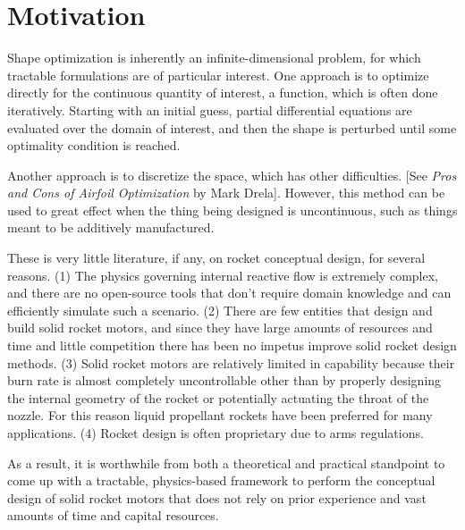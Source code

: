 \section{Motivation}
\label{sec:motivation}
	
Shape optimization is inherently an infinite-dimensional problem,
for which tractable formulations are of particular interest.
One approach is to optimize directly for the continuous quantity of interest, a function, which is often done iteratively.
Starting with an initial guess, partial differential equations are evaluated over the domain of interest,
and then the shape is perturbed until some optimality condition is reached.

Another approach is to discretize the space, which has other difficulties.
[See \textit{Pros and Cons of Airfoil Optimization} by Mark Drela].
However, this method can be used to great effect when the thing being designed is
uncontinuous, such as things meant to be additively manufactured.

These is very little literature, if any, on rocket conceptual design,
for several reasons. (1) The physics governing internal reactive flow is extremely complex,
and there are no open-source tools that don't require domain knowledge and
can efficiently simulate such a scenario.
(2) There are few entities that design and build solid rocket motors, and since they have
large amounts of resources and time and little competition there has been no impetus
improve solid rocket design methods. (3) Solid rocket motors are relatively limited
in capability because their burn rate is almost completely uncontrollable other
than by properly designing the internal geometry of the rocket or potentially actuating the
throat of the nozzle. For this reason liquid propellant rockets have been preferred for
many applications. (4) Rocket design is often proprietary due to arms regulations.

As a result, it is worthwhile from both a theoretical and practical standpoint
to come up with a tractable, physics-based framework to perform the conceptual design of solid rocket
motors that does not rely on prior experience and vast amounts of time and capital resources.

